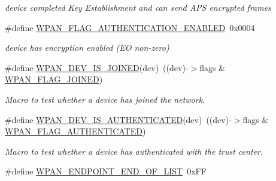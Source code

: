 \begin{DoxyCompactItemize}
\begin{DoxyCompactList}\small\item\em device completed Key Establishment and can send A\-P\-S encrypted frames \end{DoxyCompactList}\item 
\hypertarget{group__wpan__aps_gab7d95fae8b625fd39ae3b6f168a5511f}{\#define \hyperlink{group__wpan__aps_gab7d95fae8b625fd39ae3b6f168a5511f}{W\-P\-A\-N\-\_\-\-F\-L\-A\-G\-\_\-\-A\-U\-T\-H\-E\-N\-T\-I\-C\-A\-T\-I\-O\-N\-\_\-\-E\-N\-A\-B\-L\-E\-D}~0x0004}\label{group__wpan__aps_gab7d95fae8b625fd39ae3b6f168a5511f}

\begin{DoxyCompactList}\small\item\em device has encryption enabled (E\-O non-\/zero) \end{DoxyCompactList}\item 
\#define \hyperlink{group__wpan__aps_gabe1e612e16ea40f970a7f160cae6de3a}{W\-P\-A\-N\-\_\-\-D\-E\-V\-\_\-\-I\-S\-\_\-\-J\-O\-I\-N\-E\-D}(dev)~((dev)-\/$>$flags \& \hyperlink{group__wpan__aps_gaa06c0d38b4a130f9657abf26c73b49dd}{W\-P\-A\-N\-\_\-\-F\-L\-A\-G\-\_\-\-J\-O\-I\-N\-E\-D})
\begin{DoxyCompactList}\small\item\em Macro to test whether a device has joined the network. \end{DoxyCompactList}\item 
\#define \hyperlink{group__wpan__aps_ga5ba1c4d72eeac9bb8bd97ee811d7aa05}{W\-P\-A\-N\-\_\-\-D\-E\-V\-\_\-\-I\-S\-\_\-\-A\-U\-T\-H\-E\-N\-T\-I\-C\-A\-T\-E\-D}(dev)~((dev)-\/$>$flags \& \hyperlink{group__wpan__aps_ga6508b417838fc0a043f5570b65e3f24b}{W\-P\-A\-N\-\_\-\-F\-L\-A\-G\-\_\-\-A\-U\-T\-H\-E\-N\-T\-I\-C\-A\-T\-E\-D})
\begin{DoxyCompactList}\small\item\em Macro to test whether a device has authenticated with the trust center. \end{DoxyCompactList}\item 
\hypertarget{group__wpan__aps_ga0ca55f0e8039df7fba03c041e4cf5a79}{\#define \hyperlink{group__wpan__aps_ga0ca55f0e8039df7fba03c041e4cf5a79}{W\-P\-A\-N\-\_\-\-E\-N\-D\-P\-O\-I\-N\-T\-\_\-\-E\-N\-D\-\_\-\-O\-F\-\_\-\-L\-I\-S\-T}~0x\-F\-F}\label{group__wpan__aps_ga0ca55f0e8039df7fba03c041e4cf5a79}


\end{DoxyCompactItemize}

